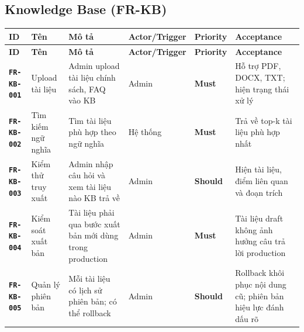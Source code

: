 \documentclass[12pt,a4paper]{article}
\newcommand{\reqid}[1]{\texttt{\textbf{\color{AloBlue}#1}}}
\newcommand{\musthave}{\colorbox{PrioMust}{\small\textbf{Must}}}
\newcommand{\shouldhave}{\colorbox{PrioShould}{\small\textbf{Should}}}
\begin{document}
\subsection{Knowledge Base (FR-KB)}
\begin{longtable}{L{2.2cm} L{2.2cm} L{3.8cm} L{2.8cm} C{1.5cm} L{3cm}}
  \toprule{}\textbf{ID}&\textbf{Tên}&\textbf{Mô tả}&\textbf{Actor/Trigger}&\textbf{Priority}&\textbf{Acceptance}\\
  \midrule\endfirsthead\toprule{}\textbf{ID}&\textbf{Tên}&\textbf{Mô tả}&\textbf{Actor/Trigger}&\textbf{Priority}&\textbf{Acceptance}\\\midrule\endhead\bottomrule\endlastfoot
  \reqid{FR-KB-001} & Upload tài liệu & Admin upload tài liệu chính sách, FAQ vào KB & Admin & \musthave & Hỗ trợ PDF, DOCX, TXT; hiện trạng thái xử lý \\
  \reqid{FR-KB-002} & Tìm kiếm ngữ nghĩa & Tìm tài liệu phù hợp theo ngữ nghĩa & Hệ thống & \musthave & Trả về top-k tài liệu phù hợp nhất \\
  \reqid{FR-KB-003} & Kiểm thử truy xuất & Admin nhập câu hỏi và xem tài liệu nào KB trả về & Admin & \shouldhave & Hiện tài liệu, điểm liên quan và đoạn trích \\
  \reqid{FR-KB-004} & Kiểm soát xuất bản & Tài liệu phải qua bước xuất bản mới dùng trong production & Admin & \musthave & Tài liệu draft không ảnh hưởng câu trả lời production \\
  \reqid{FR-KB-005} & Quản lý phiên bản & Mỗi tài liệu có lịch sử phiên bản; có thể rollback & Admin & \shouldhave & Rollback khôi phục nội dung cũ; phiên bản hiệu lực đánh dấu rõ \\
\end{longtable}
\end{document}
